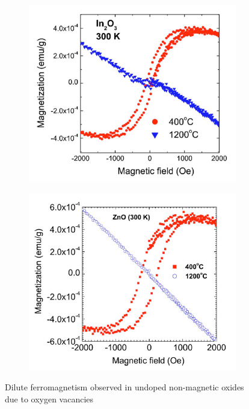 \documentclass[main.tex]{subfiles}
\begin{document}
\begin{figure}[!htb]
\begin{subfigure}[h]{0.46\textwidth}
  		\caption{}
	\end{subfigure}
	\begin{subfigure}[h]{0.45\textwidth}
		\centering
		\includegraphics[width=\linewidth]{sunderasan_in2o3}
  		\caption{}
	\end{subfigure}
	\begin{subfigure}[h]{0.47\textwidth}
  		\centering
  		\includegraphics[width=\linewidth]{sunderasan_zno}
  		\caption{}
	\end{subfigure}
\caption{Dilute ferromagnetism observed in undoped non-magnetic oxides due to oxygen vacancies \cite{sundaresan2006ferromagnetism}} 
\label{fig:fig}

\end{figure}
\FloatBarrier
\end{document}
